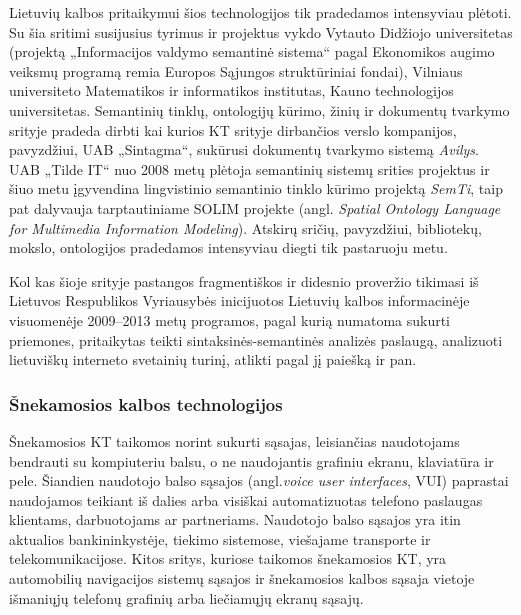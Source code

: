 \begin{multicols}{2}
    Lietuvių kalbos pritaikymui šios technologijos tik pradedamos intensyviau plėtoti. Su šia sritimi susijusius tyrimus ir projektus vykdo Vytauto Didžiojo universitetas (projektą „Informacijos valdymo semantinė sistema“ pagal Ekonomikos augimo veiksmų programą remia Europos Sąjungos struktūriniai fondai), Vilniaus universiteto Matematikos ir informatikos institutas, Kauno technologijos universitetas. Semantinių tinklų, ontologijų kūrimo, žinių ir dokumentų tvarkymo srityje pradeda dirbti kai kurios KT srityje dirbančios verslo kompanijos, pavyzdžiui, UAB „Sintagma“, sukūrusi dokumentų tvarkymo sistemą \textit{Avilys}. UAB „Tilde IT“ nuo 2008 metų plėtoja semantinių sistemų srities projektus ir šiuo metu įgyvendina lingvistinio semantinio tinklo kūrimo projektą \textit{SemTi}, taip pat dalyvauja tarptautiniame SOLIM projekte (angl. \textit{Spatial Ontology Language for Multimedia Information Modeling}). Atskirų sričių, pavyzdžiui, bibliotekų, mokslo, ontologijos pradedamos intensyviau diegti tik pastaruoju metu.   

    Kol kas šioje srityje pastangos fragmentiškos ir didesnio proveržio tikimasi iš Lietuvos Respublikos Vyriausybės inicijuotos Lietuvių kalbos informacinėje visuomenėje 2009–2013 metų programos, pagal kurią numatoma sukurti priemones, pritaikytas teikti sintaksinės-semantinės analizės paslaugą, analizuoti lietuviškų interneto svetainių turinį, atlikti pagal jį paiešką ir pan.
  
\subsubsection{Šnekamosios kalbos technologijos}

Šnekamosios KT taikomos norint sukurti sąsajas, leisiančias naudotojams bendrauti su kompiuteriu balsu, o ne naudojantis grafiniu ekranu, klaviatūra ir pele. Šiandien naudotojo balso sąsajos (angl.\textit{voice user interfaces}, VUI) paprastai naudojamos teikiant iš dalies arba visiškai automatizuotas telefono paslaugas klientams, darbuotojams ar partneriams. Naudotojo balso sąsajos yra itin aktualios bankininkystėje, tiekimo sistemose, viešajame transporte ir telekomunikacijose. Kitos sritys, kuriose taikomos šnekamosios KT, yra automobilių navigacijos sistemų sąsajos ir šnekamosios kalbos sąsaja vietoje išmaniųjų telefonų grafinių arba liečiamųjų ekranų sąsajų.



\end{multicols}
